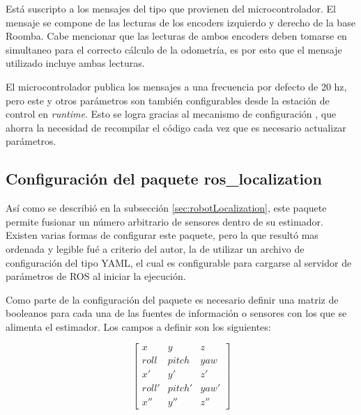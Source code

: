 Está suscripto a los mensajes del tipo  que provienen del microcontrolador. El mensaje se compone de las lecturas de los encoders izquierdo y derecho de la base Roomba. Cabe mencionar que las lecturas de ambos encoders deben tomarse en simultaneo para el correcto cálculo de la odometría, es por esto que el mensaje utilizado incluye ambas lecturas.

El microcontrolador publica los mensajes a una frecuencia por defecto de 20 hz, pero este y otros parámetros son también configurables desde la estación de control en \textit{runtime}. Esto se logra gracias al mecanismo de configuración , que ahorra la necesidad de recompilar el código cada vez que es necesario actualizar parámetros.

\subsection{Configuración del paquete ros\_localization}

Así como se describió en la subsección \ref{sec:robotLocalization}, este paquete permite fusionar un número arbitrario de sensores dentro de su estimador. Existen varias formas de configurar este paquete, pero la que resultó mas ordenada y legible fué a criterio del autor, la de utilizar un archivo de configuración del tipo YAML, el cual es configurable para cargarse al servidor de parámetros de ROS al iniciar la ejecución.

Como parte de la configuración del paquete es necesario definir una matriz de booleanos para cada una de las fuentes de información o sensores con los que se alimenta el estimador. Los campos a definir son los siguientes:

\[
  \begin{bmatrix}
    x     & y      & z    \\
    roll  & pitch  & yaw  \\
    x'    & y'     & z'   \\
    roll' & pitch' & yaw' \\
    x''   & y''    & z''
  \end{bmatrix}
\]

\newpage

\newcommand\YAMLcolonstyle{\color{green}\mdseries}
\newcommand\YAMLkeystyle{\color{black}\bfseries}
\newcommand\YAMLvaluestyle{\color{blue}\mdseries}

\makeatletter

\newcommand\language@yaml{yaml}

